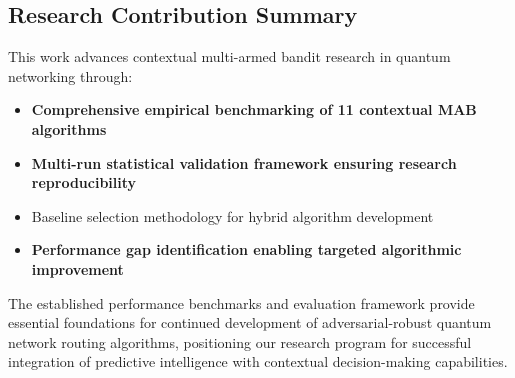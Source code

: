 \documentclass[12pt,a4paper]{article}
\newcommand{\performance}[1]{\textcolor{performancecolor}{\textbf{#1}}}
\newcommand{\stochastic}[1]{\textcolor{stochasticcolor}{\textbf{#1}}}
\newcommand{\highlight}[1]{\colorbox{highlightcolor}{#1}}
\newcommand{\success}[1]{\textcolor{successcolor}{\textbf{#1}}}
\begin{document}
\subsection{Research Contribution Summary}

This work advances contextual multi-armed bandit research in quantum networking through:

\begin{itemize}
\item \performance{Comprehensive empirical benchmarking of 11 contextual MAB algorithms}
\item \success{Multi-run statistical validation framework ensuring research reproducibility}
\item \highlight{Baseline selection methodology for hybrid algorithm development}
\item \stochastic{Performance gap identification enabling targeted algorithmic improvement}
\end{itemize}

The established performance benchmarks and evaluation framework provide essential foundations for continued development of adversarial-robust quantum network routing algorithms, positioning our research program for successful integration of predictive intelligence with contextual decision-making capabilities.
\end{document}

